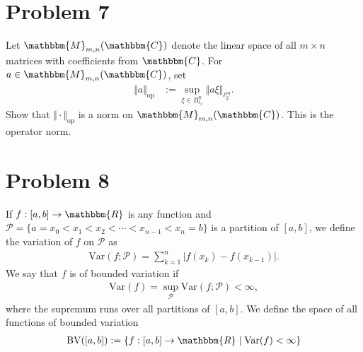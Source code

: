 \documentclass[10pt]{extarticle}
\newcommand{\R}{\mathbbm{R}}
\begin{document}
  \section{Problem 7}%
  Let $\mathbbm{M}_{m,n}(\mathbbm{C})$ denote the linear space of all $m\times n$ matrices with coefficients from $\mathbbm{C}$. For $a\in \mathbbm{M}_{m,n}(\mathbbm{C})$, set
  \begin{align*}
    \Vert a\Vert_{\text{op}} &:= \sup_{\xi\in B_{\ell_2}^n}\Vert a\xi\Vert_{\ell_2^{m}}.
  \end{align*}
  Show that $\Vert \cdot \Vert_{\text{op}}$ is a norm on $\mathbbm{M}_{m,n}(\mathbbm{C})$. This is the operator norm.
  \section{Problem 8}%
  If $f: [a,b]\rightarrow\R$ is any function and $\mathcal{P} = \{a=x_0<x_1<x_2 < \cdots < x_{n-1} < x_n = b\}$ is a partition of $[a,b]$, we define the variation of $f$ on $\mathcal{P}$ as
  \begin{align*}
    \text{Var}(f;\mathcal{P}) = \sum_{k=1}^{n}|f(x_k)-f(x_{k-1})|.
  \end{align*}
  We say that $f$ is of bounded variation if
  \begin{align*}
    \text{Var}(f) = \sup_{\mathcal{P}}\text{Var}(f;\mathcal{P}) < \infty,
  \end{align*}
  where the supremum runs over all partitions of $[a,b]$. We define the space of all functions of bounded variation
  \begin{align*}
    \text{BV}([a,b]) := \{f:[a,b]\rightarrow\R\mid \text{Var}(f)<\infty\}
  \end{align*}
\end{document}
